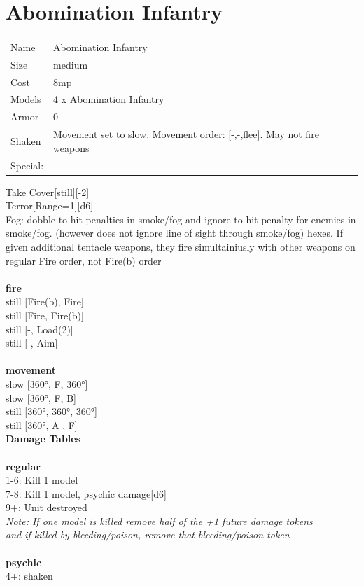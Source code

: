 \clearpage

\section{ Abomination Infantry }

\begin{tabular}{ll}
  Name & Abomination Infantry \\
  Size & medium\\
  Cost & 8mp\\
  Models & 4 x Abomination Infantry\\
  Armor & 0\\
  Shaken & Movement set to slow. Movement order: [-,-,flee]. May not fire weapons\\
  Special: \\
\end{tabular}

\noindent Take Cover[still][-2]\\ 
Terror[Range=1][d6]\\ 
Fog: dobble to-hit penalties in smoke/fog and ignore to-hit penalty for enemies in smoke/fog. (however does not ignore line of sight through smoke/fog) hexes. If given additional tentacle weapons, they fire simultainiusly with other weapons on regular Fire order, not Fire(b) order\\ 


\ \\ {\bf fire } \\
still [Fire(b), Fire] \\
still [Fire, Fire(b)] \\
still [-, Load(2)] \\
still [-, Aim] \\
\ \\ {\bf movement } \\
slow [360°, F, 360°] \\
slow [360°, F, B] \\
still [360°, 360°, 360°] \\
still [360°, A , F] \\


{\bf Damage Tables} \\
\ \\ {\bf regular } \\
1-6: Kill 1 model \\
7-8: Kill 1 model, psychic damage[d6] \\
9+: Unit destroyed \\
{{\it Note: If one model is killed remove half of the +1 future damage tokens \\ and if killed by bleeding/poison, remove that bleeding/poison token}} \\
\ \\ {\bf psychic } \\
4+: shaken \\


